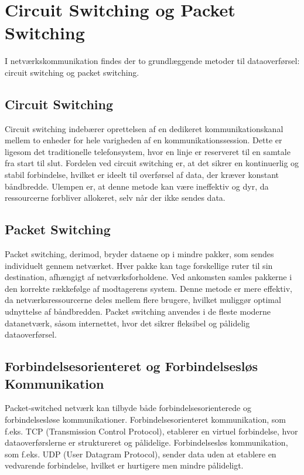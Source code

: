 \section{Circuit Switching og Packet Switching}
I netværkskommunikation findes der to grundlæggende metoder til dataoverførsel: circuit switching og packet switching. 

\subsection{Circuit Switching}
Circuit switching indebærer oprettelsen af en dedikeret kommunikationskanal mellem to enheder for hele varigheden af en kommunikationssession. Dette er ligesom det traditionelle telefonsystem, hvor en linje er reserveret til en samtale fra start til slut. Fordelen ved circuit switching er, at det sikrer en kontinuerlig og stabil forbindelse, hvilket er ideelt til overførsel af data, der kræver konstant båndbredde. Ulempen er, at denne metode kan være ineffektiv og dyr, da ressourcerne forbliver allokeret, selv når der ikke sendes data.

\subsection{Packet Switching}
Packet switching, derimod, bryder dataene op i mindre pakker, som sendes individuelt gennem netværket. Hver pakke kan tage forskellige ruter til sin destination, afhængigt af netværksforholdene. Ved ankomsten samles pakkerne i den korrekte rækkefølge af modtagerens system. Denne metode er mere effektiv, da netværksressourcerne deles mellem flere brugere, hvilket muliggør optimal udnyttelse af båndbredden. Packet switching anvendes i de fleste moderne datanetværk, såsom internettet, hvor det sikrer fleksibel og pålidelig dataoverførsel.

\subsection{Forbindelsesorienteret og Forbindelsesløs Kommunikation}
Packet-switched netværk kan tilbyde både forbindelsesorienterede og forbindelsesløse kommunikationer. Forbindelsesorienteret kommunikation, som f.eks. TCP (Transmission Control Protocol), etablerer en virtuel forbindelse, hvor dataoverførslerne er struktureret og pålidelige. Forbindelsesløs kommunikation, som f.eks. UDP (User Datagram Protocol), sender data uden at etablere en vedvarende forbindelse, hvilket er hurtigere men mindre pålideligt.

